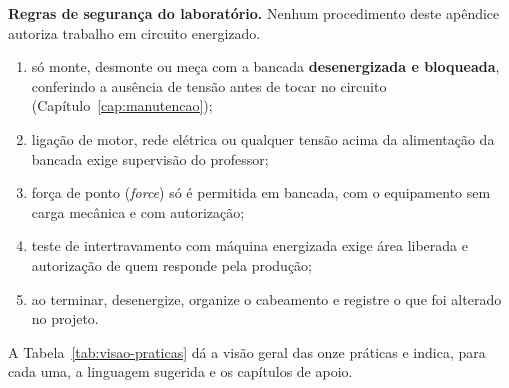 \begin{atencao}
\textbf{Regras de segurança do laboratório.} Nenhum procedimento deste apêndice autoriza trabalho em
circuito energizado.
\begin{enumerate}
  \item só monte, desmonte ou meça com a bancada \textbf{desenergizada e bloqueada}, conferindo a
        ausência de tensão antes de tocar no circuito (Capítulo~\ref{cap:manutencao});
  \item ligação de motor, rede elétrica ou qualquer tensão acima da alimentação da bancada exige
        supervisão do professor;
  \item força de ponto (\emph{force}) só é permitida em bancada, com o equipamento sem carga mecânica
        e com autorização;
  \item teste de intertravamento com máquina energizada exige área liberada e autorização de quem
        responde pela produção;
  \item ao terminar, desenergize, organize o cabeamento e registre o que foi alterado no projeto.
\end{enumerate}
\end{atencao}

A Tabela~\ref{tab:visao-praticas} dá a visão geral das onze práticas e indica, para cada uma, a
linguagem sugerida e os capítulos de apoio.

